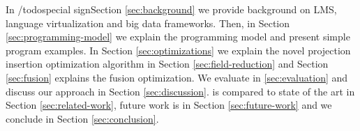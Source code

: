 In /todo{special sign}Section \ref{sec:background} we provide background on LMS,
language virtualization and big data frameworks. Then, in Section
\ref{sec:programming-model} we explain the programming model and present simple
program examples. In Section \ref{sec:optimizations} we explain the novel
projection insertion optimization algorithm in Section \ref{sec:field-reduction}
and Section \ref{sec:fusion} explains the fusion optimization. We evaluate \tool
in \ref{sec:evaluation} and discuss our approach in Section
\ref{sec:discussion}. \tool is compared to state of the art in Section
\ref{sec:related-work}, future work is in Section \ref{sec:future-work} and we
conclude in Section \ref{sec:conclusion}.
